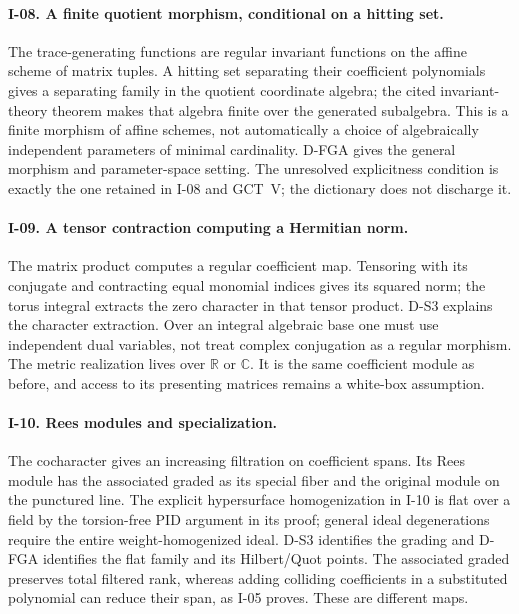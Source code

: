 \documentclass[11pt,a4paper]{article}
\theoremstyle{definition}\newtheorem{definition}{Definition}
\begin{document}
\paragraph{I-08. A finite quotient morphism, conditional on a hitting set.}
The trace-generating functions are regular invariant functions on the affine scheme of matrix tuples. A hitting set separating their coefficient polynomials gives a separating family in the quotient coordinate algebra; the cited invariant-theory theorem makes that algebra finite over the generated subalgebra. This is a finite morphism of affine schemes, not automatically a choice of algebraically independent parameters of minimal cardinality. D-FGA gives the general morphism and parameter-space setting. The unresolved explicitness condition is exactly the one retained in I-08 and GCT~V; the dictionary does not discharge it.

\paragraph{I-09. A tensor contraction computing a Hermitian norm.}
The matrix product computes a regular coefficient map. Tensoring with its conjugate and contracting equal monomial indices gives its squared norm; the torus integral extracts the zero character in that tensor product. D-S3 explains the character extraction. Over an integral algebraic base one must use independent dual variables, not treat complex conjugation as a regular morphism. The metric realization lives over $\mathbb R$ or $\mathbb C$. It is the same coefficient module as before, and access to its presenting matrices remains a white-box assumption.

\paragraph{I-10. Rees modules and specialization.}
The cocharacter gives an increasing filtration on coefficient spans. Its Rees module has the associated graded as its special fiber and the original module on the punctured line. The explicit hypersurface homogenization in I-10 is flat over a field by the torsion-free PID argument in its proof; general ideal degenerations require the entire weight-homogenized ideal. D-S3 identifies the grading and D-FGA identifies the flat family and its Hilbert/Quot points. The associated graded preserves total filtered rank, whereas adding colliding coefficients in a substituted polynomial can reduce their span, as I-05 proves. These are different maps.
\end{document}
